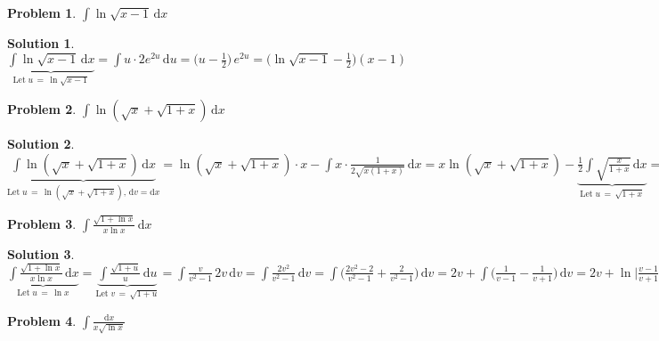 \documentclass[11pt,a4paper]{article}
\newcommand{\ds}{\displaystyle}
\theoremstyle{definition}
\newtheorem*{problem}{Problem}
\newtheorem*{solution}{Solution}
\begin{document}
\begin{problem}
  $\ds\int\!\ln \sqrt{x - 1}\,\text{d}x$
\end{problem}

\begin{solution}
  $\ds\underbrace{\int\!\ln \sqrt{x - 1}\,\text{d}x}_{\text{Let}\;u\,=\,\ln\sqrt{x - 1}} = \int\!u\cdot 2e^{2u}\,\text{d}u = \Big(u - \frac{1}{2}\Big)\,e^{2u} = \Big(\ln\sqrt{x - 1} - \frac{1}{2}\Big)(x - 1)$
\end{solution}

\begin{problem}
  $\ds\int\!\ln(\sqrt{x} + \sqrt{1 + x})\,\text{d}x$
\end{problem}

\begin{solution}
$\ds\underbrace{\int\!\ln(\sqrt{x} + \sqrt{1 + x})\,\text{d}x}_{\text{Let}\;u\,=\,\ln(\sqrt{x} + \sqrt{1 + x}),\,\text{d}v = \text{d}x} = \ln(\sqrt{x} + \sqrt{1 + x})\cdot x - \int\!x\cdot\frac{1}{2\sqrt{x(1 + x)}}\,\text{d}x = x\ln(\sqrt{x} + \sqrt{1 + x}) - \underbrace{\frac{1}{2}\int\!\sqrt{\frac{x}{1 + x}}\,\text{d}x}_{\text{Let}\;u\,=\,\sqrt{1 + x}} = x\ln(\sqrt{x} + \sqrt{1 + x}) - \frac{1}{2}\int\!\frac{\sqrt{u^2 - 1}}{u}\cdot 2u\,\text{d}u = x\ln(\sqrt{x} + \sqrt{1 + x}) - \underbrace{\int\!\!\sqrt{u^2 - 1}\,\text{d}u}_{\text{Let}\;u\,=\,\sec\theta} = x\ln(\sqrt{x} + \sqrt{1 + x}) - \frac{1}{2}\,\big(u\sqrt{u^2 - 1} - \ln|u + \sqrt{u^2 - 1}|\big) = \Big(x + \frac{1}{2}\Big)\,\ln(\sqrt{x} + \sqrt{1 + x}) - \frac{1}{2}\sqrt{x(1 + x)}$
\end{solution}

\begin{problem}
  $\ds\int\!\frac{\sqrt{1+\ln x}}{x \ln x}\,\text{d}x$
\end{problem}

\begin{solution}
  $\ds\underbrace{\int\!\frac{\sqrt{1+\ln x}}{x \ln x}\,\text{d}x}_{\text{Let}\;u\,=\,\ln x} = \underbrace{\int\!\frac{\sqrt{1+u}}{u}\,\text{d}u}_{\text{Let}\;v\,=\,\sqrt{1 + u}} = \int\!\frac{v}{v^2 - 1}\,2v\,\text{d}v = \int\!\frac{2v^2}{v^2 - 1}\,\text{d}v = \int\!\Big(\frac{2v^2 - 2}{v^2 - 1} + \frac{2}{v^2 - 1}\Big)\,\text{d}v = 2v + \int\!\Big(\frac{1}{v - 1} - \frac{1}{v + 1}\Big)\,\text{d}v = 2v + \ln\Big|\frac{v - 1}{v + 1}\Big| = 2\sqrt{1 + \ln x} + \ln\Big|\frac{\sqrt{1 + \ln x} - 1}{\sqrt{1 + \ln x} + 1}\Big|$
\end{solution}

\begin{problem}
  $\ds\int\!\frac{\text{d}x}{x\sqrt{\ln x}}$
\end{problem}
\end{document}
